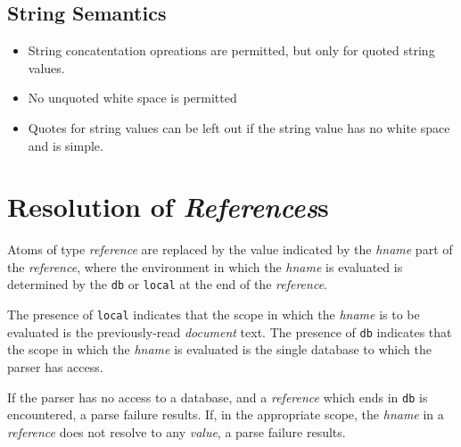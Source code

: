 \documentclass{memarticle}
\begin{document}
{                \subsection{String Semantics}
                        \begin{itemize}
                                \item String concatentation opreations are permitted, but only for quoted string values.
                                \item No unquoted white space is permitted
                                \item Quotes for string values can be left out if the string value has no white space and is simple.
                        \end{itemize}
        \section{Resolution of \emph{References}s}
                Atoms of type \emph{reference} are replaced
                by the value indicated by the \emph{hname} part of the \emph{reference},
                where the environment in which the \emph{hname} is evaluated is determined
                by the \texttt{db} or \texttt{local} at the end of the \emph{reference}.
                \par
                The presence of \texttt{local} indicates 
                that the scope in which the \emph{hname} is to be evaluated
                is the previously-read \emph{document} text.
                The presence of 
                \texttt{db} indicates
                that the scope in which the \emph{hname} is evaluated
                is the single database
                to which the parser has access.
                \par
                If the parser has no access to a database,
                and a \emph{reference} which ends in \texttt{db} is encountered,
                a parse failure results.
                If,
                in the appropriate scope,
                the \emph{hname} in a \emph{reference} does not resolve to any \emph{value},
                a parse failure results.
}
\end{document}
